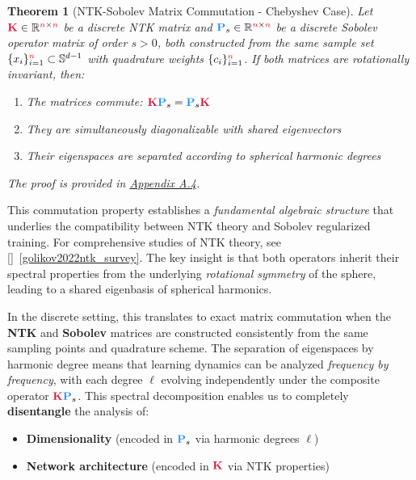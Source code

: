 \documentclass[a4paper]{article}
\newcommand{\Kop}{\textcolor{kernelcolor}{\mathbf{K}}}
\newcommand{\Pop}{\textcolor{sobolevcolor}{\mathbf{P}}}
\theoremstyle{plain}
\newtheorem{theorem}{Theorem}[section]
\theoremstyle{definition}
\theoremstyle{remark}
\newcommand{\Kop}{\textcolor{kernelcolor}{\mathbf{K}}}
\newcommand{\Pop}{\textcolor{sobolevcolor}{\mathbf{P}}}
\begin{document}
\begin{theorem}[NTK-Sobolev Matrix Commutation - Chebyshev Case]
\label{thm:ntk_sobolev_commutation}
Let $\Kop \in \mathbb{R}^{\textcolor{red}{n} \times \textcolor{red}{n}}$ be a discrete \textit{NTK matrix} and $\Pop_s \in \mathbb{R}^{\textcolor{red}{n} \times \textcolor{red}{n}}$ be a discrete \textit{Sobolev operator matrix} of order $s > 0$, both constructed from the same sample set $\{x_i\}_{i=1}^{\textcolor{red}{n}} \subset \mathbb{S}^{d-1}$ with quadrature weights $\{c_i\}_{i=1}^{\textcolor{red}{n}}$. If both matrices are rotationally invariant, then:
\begin{enumerate}
    \item The matrices commute: $\Kop\Pop_s = \Pop_s\Kop$
    \item They are simultaneously diagonalizable with shared eigenvectors
    \item Their eigenspaces are separated according to spherical harmonic degrees
\end{enumerate}
The proof is provided in \hyperref[sec:appendix_commutation]{Appendix A.4}.
\end{theorem}
\begin{tcolorbox}[colback=green!10,colframe=green!60!black,title={\textbf{Personal Contribution : Fundamental Algebraic Structure of NTK-Sobolev Commutation}},enhanced,drop shadow]
    This commutation property establishes a \textit{fundamental algebraic structure} that underlies the compatibility between NTK theory and Sobolev regularized training. For comprehensive studies of NTK theory, see []~\ref{golikov2022ntk_survey}. The key insight is that both operators inherit their spectral properties from the underlying \textit{rotational symmetry} of the sphere, leading to a shared eigenbasis of spherical harmonics.

    In the discrete setting, this translates to exact matrix commutation when the \textcolor{kernelcolor}{\textbf{NTK}} and \textcolor{sobolevcolor}{\textbf{Sobolev}} matrices are constructed consistently from the same sampling points and quadrature scheme. The separation of eigenspaces by harmonic degree means that learning dynamics can be analyzed \textit{frequency by frequency}, with each degree $\ell$ evolving independently under the composite operator $\Kop\Pop_s$.
    This spectral decomposition enables us to completely \textbf{disentangle} the analysis of:
\begin{itemize}
\item \textcolor{sobolevcolor}{\textbf{Dimensionality}} (encoded in $\Pop_s$ via harmonic degrees $\ell$)
\item \textcolor{kernelcolor}{\textbf{Network architecture}} (encoded in $\Kop$ via NTK properties)
\end{itemize}
\end{tcolorbox}
\end{document}
